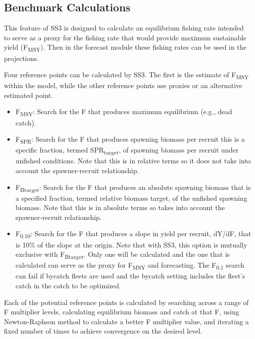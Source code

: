 \hypertarget{Benchmark}{}
\subsection{Benchmark Calculations}
This feature of SS3 is designed to calculate an equilibrium fishing rate intended to serve as a proxy for the fishing rate that would provide maximum sustainable yield (F\textsubscript{MSY}). Then in the forecast module these fishing rates can be used in the projections.

Four reference points can be calculated by SS3. The first is the estimate of F\textsubscript{MSY} within the model, while the other reference points use proxies or an alternative estimated point.

\begin{itemize}
	\item F\textsubscript{MSY}: Search for the F that produces maximum equilibrium (e.g., dead catch).
	
	\item F\textsubscript{SPR}: Search for the F that produces spawning biomass per recruit this is a specific fraction, termed SPR\textsubscript{target}, of spawning biomass per recruit under unfished conditions. Note that this is in relative terms so it does not take into account the spawner-recruit relationship.
	
	\item F\textsubscript{Btarget}: Search for the F that produces an absolute spawning biomass that is a specified fraction, termed relative biomass target, of the unfished spawning biomass. Note that this is in absolute terms so takes into account the spawner-recruit relationship. 
	
	\item F\textsubscript{0.10}: Search for the F that produces a slope in yield per recruit, dY/dF, that is 10\% of the slope at the origin. Note that with SS3, this option is mutually exclusive with F\textsubscript{Btarget}. Only one will be calculated and the one that is calculated can serve as the proxy for F\textsubscript{MSY} and forecasting. The F\textsubscript{0.1} search can fail if bycatch fleets are used and the bycatch setting includes the fleet's catch in the catch to be optimized.
\end{itemize}

Each of the potential reference points is calculated by searching across a range of F multiplier levels, calculating equilibrium biomass and catch at that F, using Newton-Raphson method to calculate a better F multiplier value, and iterating a fixed number of times to achieve convergence on the desired level.

